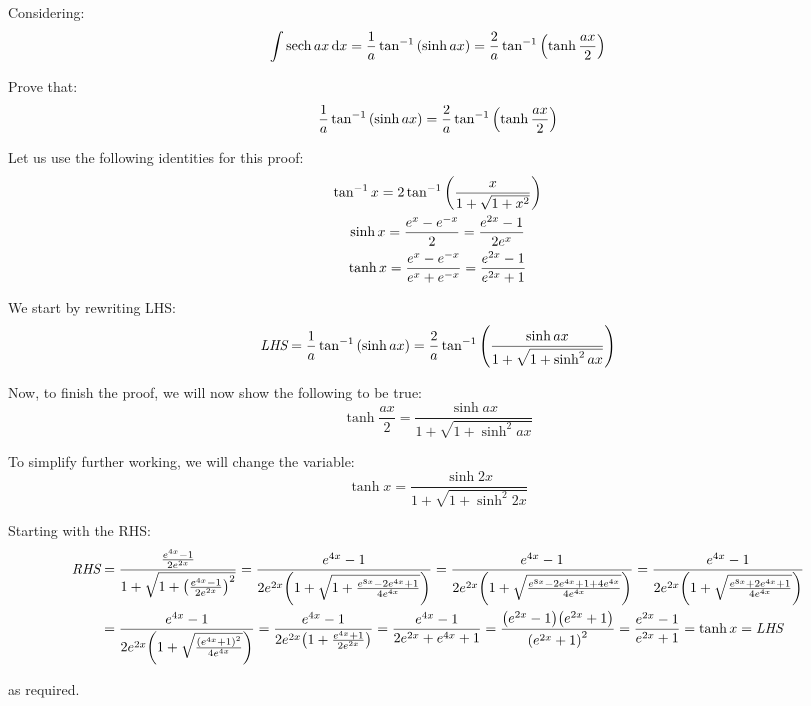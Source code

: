 \documentclass{article}
\begin{document}
\thispagestyle{plain}
\MakeCustomTitle
\bigskip


\begin{QuestionFrame}
	Considering:
	\begin{equation*}
		\int{\sech{ax} \,\diff{x}}
			= \frac{1}{a} \tan^{-1}{\parens*{\sinh{ax}}}
			= \frac{2}{a} \tan^{-1}{\parens*{\tanh{\frac{ax}{2}}}}
	\end{equation*}
	
	Prove that:
	\begin{equation*}
		\frac{1}{a} \tan^{-1}{\parens*{\sinh{ax}}}
			= \frac{2}{a} \tan^{-1}{\parens*{\tanh{\frac{ax}{2}}}}
	\end{equation*}
\end{QuestionFrame}

Let us use the following identities for this proof:
\begin{gather*}
	\tan^{-1}{x} = 2 \tan^{-1}{\parens*{\frac{x}{1 + \sqrt{1 + x^2}}}} \\
	\sinh{x} = \frac{e^x - e^{-x}}{2} = \frac{e^{2x} - 1}{2 e^x} \\
	\tanh{x} = \frac{e^x - e^{-x}}{e^x + e^{-x}} = \frac{e^{2x} - 1}{e^{2x} + 1}
\end{gather*}

We start by rewriting LHS:
\begin{equation*}
	\lhs
		= \frac{1}{a} \tan^{-1}{\parens*{\sinh{ax}}}
		= \frac{2}{a} \tan^{-1}{\parens*{\frac{\sinh{ax}}{1 + \sqrt{1 + \sinh^2{ax}}}}} 
\end{equation*}

Now, to finish the proof, we will now show the following to be true:
\begin{equation*}
	\tanh{\frac{ax}{2}} = \frac{\sinh{ax}}{1 + \sqrt{1 + \sinh^2{ax}}}
\end{equation*}

To simplify further working, we will change the variable:
\begin{equation*}
	\tanh{x} = \frac{\sinh{2x}}{1 + \sqrt{1 + \sinh^2{2x}}}
\end{equation*}

Starting with the RHS:
\begin{align*}
	\rhs
	&= \frac{\frac{e^{4x} - 1}{2 e^{2x}}}{1 + \sqrt{1 + \parens*{\frac{e^{4x} - 1}{2 e^{2x}}}^2}}
	= \frac{e^{4x} - 1}{2 e^{2x} \parens*{1 + \sqrt{1 + \frac{e^{8x} - 2 e^{4x} + 1}{4 e^{4x}}}}}
	= \frac{e^{4x} - 1}{2 e^{2x} \parens*{1 + \sqrt{\frac{e^{8x} - 2 e^{4x} + 1 + 4 e^{4x}}{4 e^{4x}}}}}
	= \frac{e^{4x} - 1}{2 e^{2x} \parens*{1 + \sqrt{\frac{e^{8x} + 2 e^{4x} + 1}{4 e^{4x}}}}}
	\\
	&= \frac{e^{4x} - 1}{2 e^{2x} \parens*{1 + \sqrt{\frac{\parens*{e^{4x} + 1}^2}{4 e^{4x}}}}}
	= \frac{e^{4x} - 1}{2 e^{2x} \parens*{1 + \frac{e^{4x} + 1}{2 e^{2x}}}}
	= \frac{e^{4x} - 1}{2 e^{2x} + e^{4x} + 1}
	= \frac{\parens*{e^{2x} - 1} \parens*{e^{2x} + 1}}{\parens*{e^{2x} + 1}^2}
	= \frac{e^{2x} - 1}{e^{2x} + 1}
	= \tanh{x}
	= \lhs
\end{align*}

as required.

\end{document}

